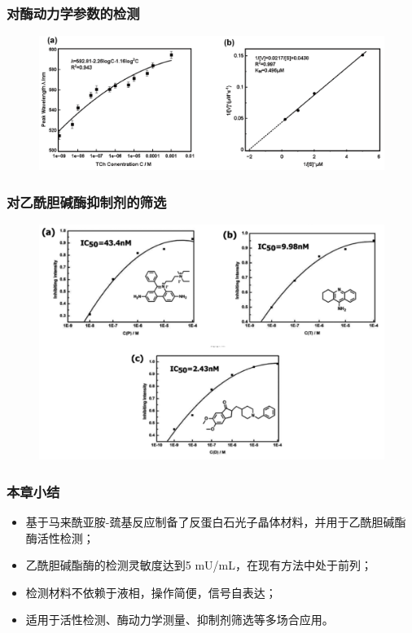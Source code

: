 \documentclass{beamer}
\begin{document}
\begin{frame}
  \frametitle{对酶动力学参数的检测}
  \begin{figure}[t]
    \centering
    \includegraphics[width=\linewidth]{figures/kinetics.png}
  \end{figure}
\end{frame}

\begin{frame}
  \frametitle{对乙酰胆碱酶抑制剂的筛选}
  \begin{figure}[t]
    \centering
    \includegraphics[width=0.85\linewidth]{figures/inhibitor.png}
  \end{figure}
\end{frame}

\begin{frame}
  \frametitle{本章小结}
  \begin{itemize}[<+-| alert@+>]
    \item
    基于马来酰亚胺-巯基反应制备了反蛋白石光子晶体材料，并用于乙酰胆碱酯酶活性检测；
    \item
    乙酰胆碱酯酶的检测灵敏度达到5 mU/mL，在现有方法中处于前列；
    \item
    检测材料不依赖于液相，操作简便，信号自表达；
    \item
    适用于活性检测、酶动力学测量、抑制剂筛选等多场合应用。
  \end{itemize}
\end{frame}
\end{document}
